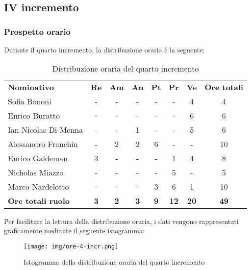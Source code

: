 \documentclass[../piano-di-progetto.tex]{subfiles}
\begin{document}
  \subsection{IV incremento}

  \subsubsection{Prospetto orario}
 Durante il quarto incremento, la distribuzione oraria è la seguente:
  \begin{table}[H]
    \centering
    \begin{tabular}{lccccccc}
    \rowcolor{lightgray}
    \textbf{Nominativo}       & \textbf{Re} & \textbf{Am} & \textbf{An} & \textbf{Pt} & \textbf{Pr} & \textbf{Ve} & \textbf{Ore totali} \\
Sofia Bononi              & -           & -           & -           & -           & -           & 4           & 4                   \\
Enrico Buratto            & -           & -           & -           & -           & -           & 6           & 6                   \\
Ian Nicolas Di Menna      & -           & -           & 1           & -           & -           & 5           & 6                   \\
Alessandro Franchin       & -           & 2           & 2           & 6           & -           & -           & 10                  \\
Enrico Galdeman           & 3           & -           & -           & -           & 1           & 4           & 8                   \\
Nicholas Miazzo           & -           & -           & -           & -           & 5           & -           & 5                   \\
Marco Nardelotto          & -           & -           & -           & 3           & 6           & 1           & 10                  \\
\textbf{Ore totali ruolo} & \textbf{3}  & \textbf{2}  & \textbf{3}  & \textbf{9}  & \textbf{12} & \textbf{20} & \textbf{49}        
    
    \end{tabular}
    \caption{Distribuzione oraria del quarto incremento}
  \end{table}


  Per facilitare la lettura della distribuzione oraria, i dati vengono rappresentati graficamente mediante il seguente istogramma:
  \begin{figure}[H]
    \centering
    \texttt{[image: img/ore-4-incr.png]}
    \caption{Istogramma della distribuzione oraria del quarto incremento}
    \label{fig:ore-componente-progettazione}
  \end{figure}
\end{document}
